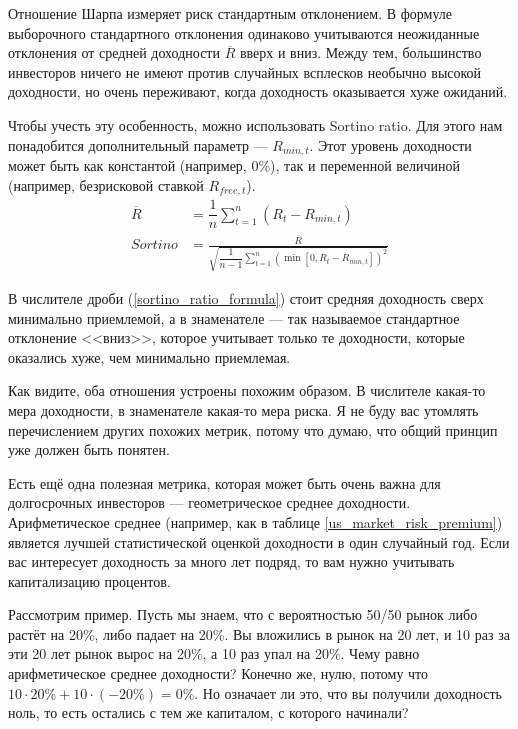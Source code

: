 Отношение Шарпа измеряет риск стандартным отклонением. В формуле выборочного 
стандартного отклонения одинаково учитываются неожиданные отклонения от средней 
доходности $\overline{R}$ вверх и вниз. Между тем, большинство инвесторов ничего 
не имеют против случайных всплесков необычно высокой доходности, но очень 
переживают, когда доходность оказывается хуже ожиданий.

Чтобы учесть эту особенность, можно использовать 
{Sortino ratio}. Для этого нам понадобится дополнительный параметр --- 
$R_{min,t}$. Этот уровень доходности может быть как константой (например, 0\%), 
так и переменной величиной (например, безрисковой ставкой $R_{free,t}$).
\begin{align}
\nonumber
\overline{R} &= \dfrac{1}{n}\sum\limits_{t=1}^{n}(R_t - R_{min,t}) \\
Sortino &= \frac
    {\overline{R}}
    {\sqrt{
        \dfrac{1}{n-1} 
        \sum\limits_{t=1}^{n}\left(\min[0, R_t - R_{min,t}]\right)^2
    }}
\label{sortino_ratio_formula}
\end{align}

В числителе дроби (\ref{sortino_ratio_formula}) стоит средняя доходность сверх 
минимально приемлемой, а в знаменателе --- так называемое стандартное отклонение 
<<вниз>>, которое учитывает только те доходности, которые оказались хуже, чем 
минимально приемлемая.

Как видите, оба отношения устроены похожим образом. В числителе какая-то мера 
доходности, в знаменателе какая-то мера риска. Я не буду вас утомлять
перечислением других похожих метрик, потому что думаю, что общий принцип уже
должен быть понятен.

Есть ещё одна полезная метрика, которая может быть очень важна для долгосрочных 
инвесторов --- геометрическое среднее доходности. Арифметическое среднее 
(например, как в таблице \ref{us_market_risk_premium}) является лучшей 
статистической оценкой доходности в один случайный год. Если вас интересует 
доходность за много лет подряд, то вам нужно учитывать капитализацию процентов.

Рассмотрим пример. Пусть мы знаем, что с вероятностью 50/50 рынок либо растёт на 
20\%, либо падает на 20\%. Вы вложились в рынок на 20 лет, и 10 раз за эти 20 
лет рынок вырос на 20\%, а 10 раз упал на 20\%. Чему равно арифметическое 
среднее доходности? Конечно же, нулю, потому что $10 \cdot 20\% + 10 \cdot
(-20\%) = 0\%$. Но означает ли это, что вы получили доходность ноль, то есть 
остались с тем же капиталом, с которого начинали?

